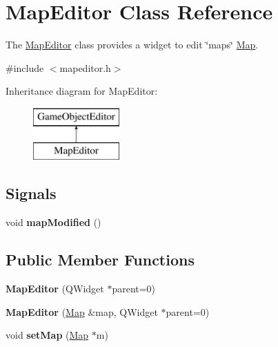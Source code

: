 \hypertarget{class_map_editor}{\section{\-Map\-Editor \-Class \-Reference}
\label{class_map_editor}
}


\-The \hyperlink{class_map_editor}{\-Map\-Editor} class provides a widget to edit \char`\"{}maps\char`\"{} \hyperlink{class_map}{\-Map}.  




{\ttfamily \#include $<$mapeditor.\-h$>$}

\-Inheritance diagram for \-Map\-Editor\-:\begin{figure}[H]
\begin{center}
\leavevmode
\includegraphics[height=2.000000cm]{class_map_editor}
\end{center}
\end{figure}
\subsection*{\-Signals}
\begin{DoxyCompactItemize}
\item 
\hypertarget{class_map_editor_a6b9ec17c3d4d73b9e7e5a944d81acd9f}{void {\bfseries map\-Modified} ()}\label{class_map_editor_a6b9ec17c3d4d73b9e7e5a944d81acd9f}

\end{DoxyCompactItemize}
\subsection*{\-Public \-Member \-Functions}
\begin{DoxyCompactItemize}
\item 
\hypertarget{class_map_editor_ad30aa4a85a356fef2e41baa6c548a972}{{\bfseries \-Map\-Editor} (\-Q\-Widget $\ast$parent=0)}\label{class_map_editor_ad30aa4a85a356fef2e41baa6c548a972}

\item 
\hypertarget{class_map_editor_a0ee13c368cf79f45e10815e97ffd5c47}{{\bfseries \-Map\-Editor} (\hyperlink{class_map}{\-Map} \&map, \-Q\-Widget $\ast$parent=0)}\label{class_map_editor_a0ee13c368cf79f45e10815e97ffd5c47}

\item 
\hypertarget{class_map_editor_a3446b5d577eecfb85c5031b9578c6339}{void {\bfseries set\-Map} (\hyperlink{class_map}{\-Map} $\ast$m)}\label{class_map_editor_a3446b5d577eecfb85c5031b9578c6339}

\end{DoxyCompactItemize}


